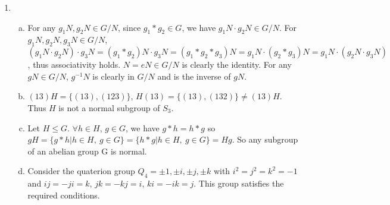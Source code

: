 \documentclass[A4paper,12pt]{article}
\theoremstyle{definition}
\numberwithin{equation}{section}
\begin{document}
\begin{enumerate}[1)]
    \item
        \begin{enumerate}[(a)]
            \item
                For any $g_1N, g_2N \in G/N$, since $g_1 * g_2 \in G$, we have $g_1N \cdot g_2N \in G/N$. 
                For $g_1N, g_2N, g_3N \in G/N$, $(g_1N \cdot g_2N) \cdot g_3N = (g_1 * g_2)N \cdot g_3N = (g_1 * g_2*g_3) N = g_1N \cdot (g_2*g_3)N = g_1N \cdot (g_2N \cdot g_3N)$, thus associativity holds.
                $N = eN \in G/N$ is clearly the identity.
                For any $gN \in G/N$, $g^{-1}N$ is clearly in $G/N$ and is the inverse of $gN$.
            \item
                $(13)H = \{(13), (123)\}$, $H(13) = \{(13), (132)\} \neq (13)H$. Thus $H$ is not a normal subgroup of $S_3$.
            \item
                Let $H \le G$. $\forall h \in H$, $g \in G$, we have $g * h = h*g$ so $gH = \{g*h| h\in H ,\: g \in G\} = \{h*g| h\in H ,\: g \in G\} = Hg$. 
                So any subgroup of an abelian group G is normal.
            \item
                Consider the quaterion group $Q_4 = {\pm1, \pm i, \pm j, \pm k}$ with $i^2 = j^2 = k^2 = -1$ and $ij = -ji = k$, $jk = -kj = i$, $ki = -ik = j$.
                This group satisfies the required conditions. 
        \end{enumerate}
\end{enumerate}
\end{document}
